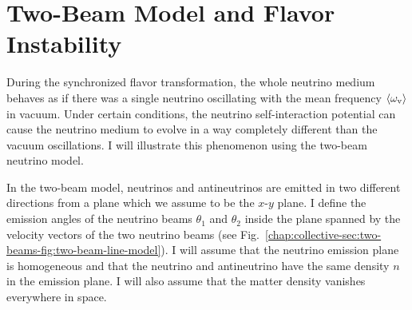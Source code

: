 






\section{\label{chap:collective-sec:two-beams}Two-Beam Model and Flavor Instability}

During the synchronized flavor transformation, the whole neutrino medium behaves as if there was a single neutrino oscillating with the mean frequency $\langle \omega_\mathrm v \rangle$ in vacuum. Under certain conditions, the neutrino self-interaction potential can cause the neutrino medium to evolve in a way completely different than the vacuum oscillations. I will illustrate this phenomenon using the two-beam neutrino model.

In the two-beam model, neutrinos and antineutrinos are emitted in two different directions from a plane which we assume to be the $x$-$y$ plane. I define the emission angles of the neutrino beams $\theta_1$ and $\theta_2$ inside the plane spanned by the velocity vectors of the two neutrino beams (see Fig.~\ref{chap:collective-sec:two-beams-fig:two-beam-line-model}). I will assume that the neutrino emission plane is homogeneous and that the neutrino and antineutrino have the same density $n$ in the emission plane. I will also assume that the matter density vanishes everywhere in space.



